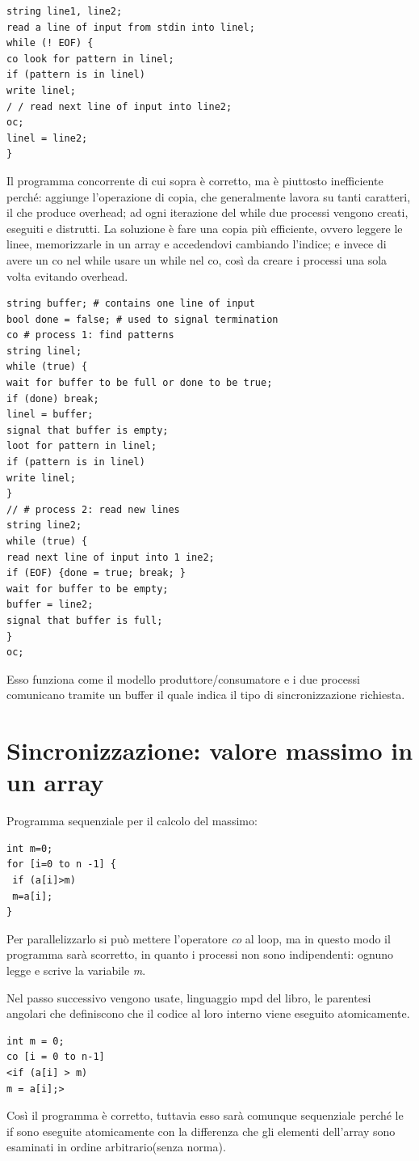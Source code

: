 \documentclass[10pt,a4paper]{book}
\begin{document}
\begin{verbatim}
string line1, line2;
read a line of input from stdin into linel;
while (! EOF) {
co look for pattern in linel;
if (pattern is in linel)
write linel;
/ / read next line of input into line2;
oc;
linel = line2;
}
\end{verbatim}


Il programma concorrente di cui sopra è corretto, ma è piuttosto inefficiente perché: aggiunge l'operazione di copia, che generalmente lavora su tanti caratteri, il che produce overhead; ad ogni iterazione del while  due processi vengono creati, eseguiti e distrutti.
La soluzione è fare una copia più efficiente, ovvero leggere le linee, memorizzarle in un array e accedendovi cambiando l'indice; e invece di avere un co nel while usare un while nel co, così da creare i processi una sola volta evitando overhead.

\begin{verbatim}
string buffer; # contains one line of input
bool done = false; # used to signal termination
co # process 1: find patterns
string linel;
while (true) {
wait for buffer to be full or done to be true;
if (done) break;
linel = buffer;
signal that buffer is empty;
loot for pattern in linel;
if (pattern is in linel)
write linel;
}
// # process 2: read new lines
string line2;
while (true) {
read next line of input into 1 ine2;
if (EOF) {done = true; break; }
wait for buffer to be empty;
buffer = line2;
signal that buffer is full;
}
oc;
\end{verbatim}


Esso funziona come il modello produttore/consumatore e i due processi comunicano tramite un buffer il quale indica il tipo di sincronizzazione richiesta.

\section{Sincronizzazione: valore massimo in un array}
Programma sequenziale per il calcolo del massimo:
\begin{verbatim}
int m=0;
for [i=0 to n -1] {
 if (a[i]>m)
 m=a[i];
} 
\end{verbatim}

Per parallelizzarlo si può mettere l'operatore \textit{co} al loop, ma in questo modo il programma sarà scorretto, in quanto i processi non sono indipendenti: ognuno legge e scrive la variabile \textit{m}.

Nel passo successivo vengono usate, linguaggio mpd del libro, le parentesi angolari che definiscono che il codice al loro interno viene eseguito atomicamente.
\begin{verbatim}
int m = 0;
co [i = 0 to n-1]
<if (a[i] > m)
m = a[i];>
\end{verbatim} 
Così il programma è corretto, tuttavia esso sarà comunque sequenziale perché le if sono eseguite atomicamente con la differenza che gli elementi dell'array sono esaminati in ordine arbitrario(senza norma).
\end{document}
